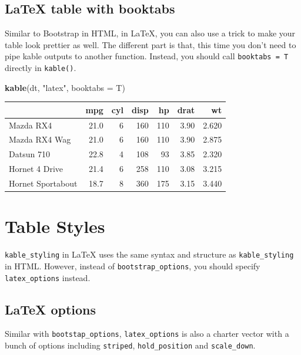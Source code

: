 \documentclass[table]{article}
\newenvironment{Shaded}{\begin{snugshade}}{\end{snugshade}}
\newcommand{\DataTypeTok}[1]{\textcolor[rgb]{0.13,0.29,0.53}{#1}}
\newcommand{\KeywordTok}[1]{\textcolor[rgb]{0.13,0.29,0.53}{\textbf{#1}}}
\newcommand{\NormalTok}[1]{#1}
\newcommand{\StringTok}[1]{\textcolor[rgb]{0.31,0.60,0.02}{#1}}
\begin{document}
\hypertarget{latex-table-with-booktabs}{%
\subsection{LaTeX table with booktabs}\label{latex-table-with-booktabs}}

Similar to Bootstrap in HTML, in LaTeX, you can also use a trick to make
your table look prettier as well. The different part is that, this time
you don't need to pipe kable outputs to another function. Instead, you
should call \texttt{booktabs\ =\ T} directly in \texttt{kable()}.

\begin{Shaded}
\begin{Highlighting}[]
\KeywordTok{kable}\NormalTok{(dt, }\StringTok{"latex"}\NormalTok{, }\DataTypeTok{booktabs =}\NormalTok{ T)}
\end{Highlighting}
\end{Shaded}

\begin{tabular}{lrrrrrr}
\toprule
  & mpg & cyl & disp & hp & drat & wt\\
\midrule
Mazda RX4 & 21.0 & 6 & 160 & 110 & 3.90 & 2.620\\
Mazda RX4 Wag & 21.0 & 6 & 160 & 110 & 3.90 & 2.875\\
Datsun 710 & 22.8 & 4 & 108 & 93 & 3.85 & 2.320\\
Hornet 4 Drive & 21.4 & 6 & 258 & 110 & 3.08 & 3.215\\
Hornet Sportabout & 18.7 & 8 & 360 & 175 & 3.15 & 3.440\\
\bottomrule
\end{tabular}

\hypertarget{table-styles}{%
\section{Table Styles}\label{table-styles}}

\texttt{kable\_styling} in LaTeX uses the same syntax and structure as
\texttt{kable\_styling} in HTML. However, instead of
\texttt{bootstrap\_options}, you should specify \texttt{latex\_options}
instead.

\hypertarget{latex-options}{%
\subsection{LaTeX options}\label{latex-options}}

Similar with \texttt{bootstap\_options}, \texttt{latex\_options} is also
a charter vector with a bunch of options including \texttt{striped},
\texttt{hold\_position} and \texttt{scale\_down}.
\end{document}
